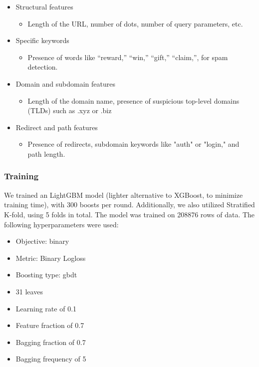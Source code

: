 \documentclass{article}
\begin{document}
\begin{itemize}
    \item Structural features
        \begin{itemize}
        \item Length of the URL, number of dots, number of query parameters, etc.
        \end{itemize}
    \item Specific keywords
        \begin{itemize}
        \item Presence of words like “reward,” “win,” “gift,” “claim,”, for spam detection.
        \end{itemize}
    \item Domain and subdomain features
        \begin{itemize}
        \item Length of the domain name, presence of suspicious top-level domains (TLDs) such as .xyz or .biz
        \end{itemize}
    \item Redirect and path features
        \begin{itemize}
            \item Presence of redirects, subdomain keywords like "auth" or "login," and path length.
        \end{itemize}
\end{itemize}

\subsubsection*{Training}

\noindent
We trained an LightGBM model (lighter alternative to XGBoost, to minimize training time), with 300 boosts per round. Additionally, we also utilized Stratified K-fold, using 5 folds in total. The model was trained on 208876 rows of data. The following hyperparameters were used: 

\begin{itemize}
    \item Objective: binary
    \item Metric: Binary Logloss
    \item Boosting type: gbdt
    \item 31 leaves
    \item Learning rate of 0.1
    \item Feature fraction of 0.7
    \item Bagging fraction of 0.7
    \item Bagging frequency of 5
\end{itemize}
\end{document}
